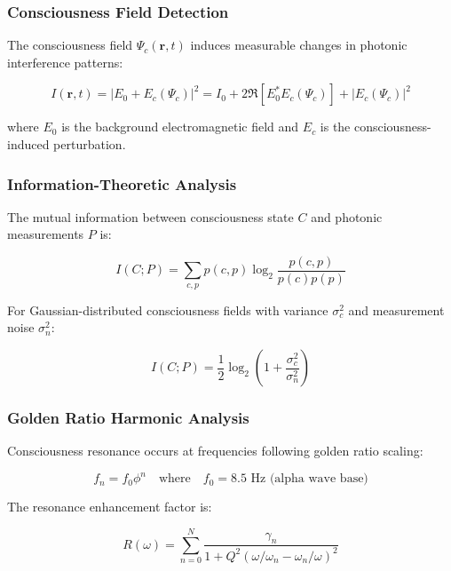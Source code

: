 \documentclass[12pt,a4paper]{article}
\begin{document}
\subsubsection{Consciousness Field Detection}

The consciousness field $\Psi_c(\mathbf{r},t)$ induces measurable changes in photonic interference patterns:

\begin{equation}
I(\mathbf{r},t) = |E_0 + E_c(\Psi_c)|^2 = I_0 + 2\Re[E_0^* E_c(\Psi_c)] + |E_c(\Psi_c)|^2
\end{equation}

where $E_0$ is the background electromagnetic field and $E_c$ is the consciousness-induced perturbation.

\subsubsection{Information-Theoretic Analysis}

The mutual information between consciousness state $C$ and photonic measurements $P$ is:

\begin{equation}
I(C;P) = \sum_{c,p} p(c,p) \log_2 \frac{p(c,p)}{p(c)p(p)}
\end{equation}

For Gaussian-distributed consciousness fields with variance $\sigma_c^2$ and measurement noise $\sigma_n^2$:

\begin{equation}
I(C;P) = \frac{1}{2} \log_2\left(1 + \frac{\sigma_c^2}{\sigma_n^2}\right)
\end{equation}

\subsubsection{Golden Ratio Harmonic Analysis}

Consciousness resonance occurs at frequencies following golden ratio scaling:

\begin{equation}
f_n = f_0 \phi^n \quad \text{where} \quad f_0 = 8.5 \text{ Hz (alpha wave base)}
\end{equation}

The resonance enhancement factor is:

\begin{equation}
R(\omega) = \sum_{n=0}^{N} \frac{\gamma_n}{1 + Q^2(\omega/\omega_n - \omega_n/\omega)^2}
\end{equation}
\end{document}
